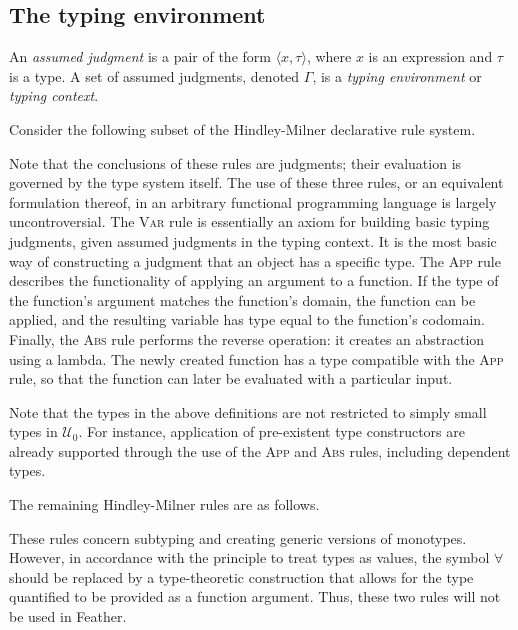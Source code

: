 \documentclass[UKenglish, 11pt, a4paper, parskip=half]{scrbook}
\begin{document}
\subsection{The typing environment}

\begin{defn}
    An \textit{assumed judgment} is a pair of the form \( \langle x, \tau \rangle \), where \( x \) is an expression and \( \tau \) is a type.
    A set of assumed judgments, denoted \( \Gamma \), is a \textit{typing environment} or \textit{typing context}.
\end{defn}
Consider the following subset of the Hindley-Milner declarative rule system.
Note that the conclusions of these rules are judgments; their evaluation is governed by the type system itself.
The use of these three rules, or an equivalent formulation thereof, in an arbitrary functional programming language is largely uncontroversial.
The \textsc{Var} rule is essentially an axiom for building basic typing judgments, given assumed judgments in the typing context.
It is the most basic way of constructing a judgment that an object has a specific type.
The \textsc{App} rule describes the functionality of applying an argument to a function.
If the type of the function's argument matches the function's domain, the function can be applied, and the resulting variable has type equal to the function's codomain.
Finally, the \textsc{Abs} rule performs the reverse operation: it creates an abstraction using a lambda.
The newly created function has a type compatible with the \textsc{App} rule, so that the function can later be evaluated with a particular input.

Note that the types in the above definitions are not restricted to simply small types in \( \mathcal U_0 \).
For instance, application of pre-existent type constructors are already supported through the use of the \textsc{App} and \textsc{Abs} rules, including dependent types.

The remaining Hindley-Milner rules are as follows.
These rules concern subtyping and creating generic versions of monotypes.
However, in accordance with the principle to treat types as values, the symbol \( \forall \) should be replaced by a type-theoretic construction that allows for the type quantified to be provided as a function argument.
Thus, these two rules will not be used in Feather.
\end{document}
